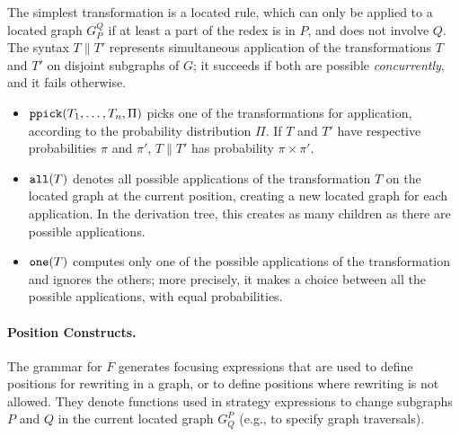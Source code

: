 \documentclass[a4paper,10pt,runningheads]{llncs}
\newcommand{\ppick}[1]{{\tt ppick(}#1{\tt )}}
\newcommand{\all}[1]{{\tt all(}#1{\tt )}}
\newcommand{\one}[1]{{\tt one(}#1{\tt )}}
\begin{document}
The simplest transformation is a located rule, which can only be
applied to a located graph $G_P^Q$ if at least a part of the redex is
in $P$, and does not involve $Q$.  The syntax $T\parallel T'$
represents simultaneous application of the transformations $T$ and
$T'$ on disjoint subgraphs of $G$; it succeeds if both are possible
\emph{concurrently}, and it fails otherwise.
\begin{itemize}
 \item $\ppick{T_1, \ldots, T_n, \Pi}$ 
picks one of the transformations for application, according to the probability distribution $\Pi$. 
If $T$ and $T'$ have respective probabilities $\pi$ and $\pi'$,
$T\parallel T'$ has probability $\pi \times \pi'$.


\item $\all{T}$ denotes all  possible applications of the transformation $T$ on the
located graph at the current position, creating a new located graph
for each application. In the derivation tree, this creates as many
children as there are possible applications.  

\item $\one{T}$
computes only one of the possible applications of
the transformation and ignores the others; more precisely, it makes a 
choice between all the possible applications, with equal probabilities. 
\end{itemize}



\paragraph{\bf Position Constructs.}

The grammar for $F$ generates focusing
expressions that
are used to define positions for rewriting in a graph, or to define positions where rewriting
is not allowed.  They  denote functions used in strategy expressions to change
subgraphs $P$ and $Q$ in the current located graph $G^P_Q$ (e.g., 
to specify graph traversals).
\end{document}

